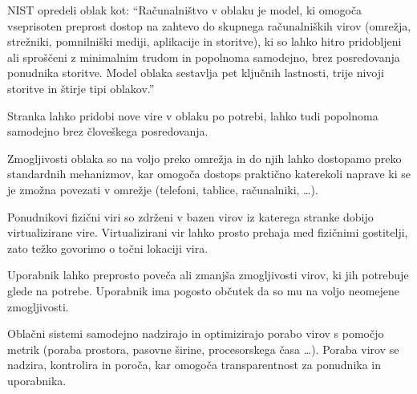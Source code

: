 \documentclass[12pt,a4paper,openany]{book}
\begin{document}
NIST opredeli oblak kot: “Računalništvo v oblaku je model, ki omogoča vseprisoten preprost dostop na zahtevo do skupnega računalniških virov (omrežja, strežniki, pomnilniški mediji, aplikacije in storitve), ki so lahko hitro pridobljeni ali sproščeni z minimalnim trudom in popolnoma samodejno, brez posredovanja ponudnika storitve. Model oblaka sestavlja pet ključnih lastnosti, trije nivoji storitve in štirje tipi oblakov.”

\begin{description}[style=nextline]
   \item[Storitev na zahtevo] Stranka lahko pridobi nove vire v oblaku po potrebi, lahko tudi popolnoma samodejno brez človeškega posredovanja.
   
   \item[Širok dostop preko omrežja] Zmogljivosti oblaka so na voljo preko omrežja in do njih lahko dostopamo preko standardnih mehanizmov, kar omogoča dostops praktično katerekoli naprave ki se je zmožna povezati v omrežje (telefoni, tablice, računalniki, …).
   
   \item[Uporaba skupnih virov] Ponudnikovi fizični viri so zdrženi v bazen virov iz katerega stranke dobijo virtualizirane vire. Virtualizirani vir lahko prosto prehaja med fizičnimi gostitelji, zato težko govorimo o točni lokaciji vira.
   
   \item[Bliskovita prožnost] Uporabnik lahko preprosto poveča ali zmanjša zmogljivosti virov, ki jih potrebuje glede na potrebe. Uporabnik ima pogosto občutek da so mu na voljo neomejene zmogljivosti.
   
   \item[Merjenje porabe in obračun glede na porabo virov]  Oblačni sistemi samodejno nadzirajo in optimizirajo porabo virov s pomočjo metrik (poraba prostora, pasovne širine, procesorskega časa …). Poraba virov se nadzira, kontrolira in poroča, kar omogoča transparentnost za ponudnika in uporabnika.
\end{description}

\end{document}

